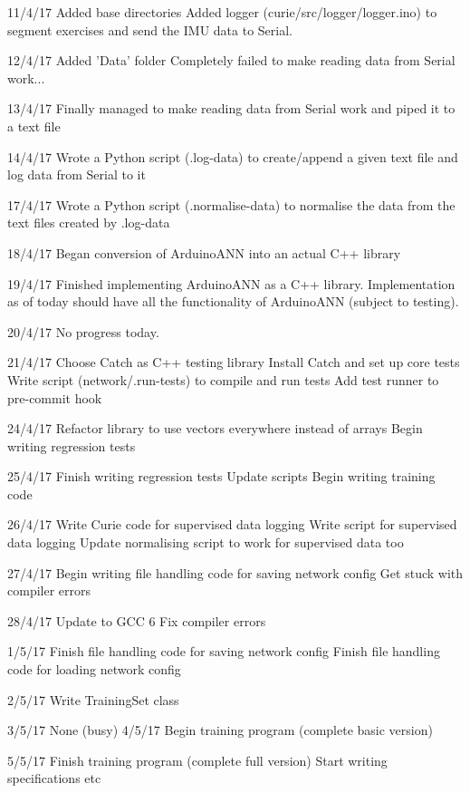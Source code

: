 \documentclass[a4paper]{article}
\begin{document}
11/4/17
    Added base directories
    Added logger (curie/src/logger/logger.ino) to segment exercises and send the IMU data to Serial.

12/4/17
    Added 'Data' folder
    Completely failed to make reading data from Serial work...

13/4/17
    Finally managed to make reading data from Serial work and piped it to a text file

14/4/17
    Wrote a Python script (.log-data) to create/append a given text file and log data from Serial to it

17/4/17
    Wrote a Python script (.normalise-data) to normalise the data from the text files created by .log-data

18/4/17
    Began conversion of ArduinoANN into an actual C++ library

19/4/17
    Finished implementing ArduinoANN as a C++ library. 
    Implementation as of today should have all the functionality of ArduinoANN (subject to testing).

20/4/17
    No progress today.

21/4/17
    Choose Catch as C++ testing library
    Install Catch and set up core tests
    Write script (network/.run-tests) to compile and run tests
    Add test runner to pre-commit hook

24/4/17
    Refactor library to use vectors everywhere instead of arrays
    Begin writing regression tests

25/4/17
    Finish writing regression tests
    Update scripts
    Begin writing training code

26/4/17
    Write Curie code for supervised data logging
    Write script for supervised data logging
    Update normalising script to work for supervised data too

27/4/17
    Begin writing file handling code for saving network config
    Get stuck with compiler errors

28/4/17
    Update to GCC 6
    Fix compiler errors

1/5/17
    Finish file handling code for saving network config
    Finish file handling code for loading network config

2/5/17
    Write TrainingSet class

3/5/17
    None (busy)
4/5/17
    Begin training program (complete basic version)

5/5/17
    Finish training program (complete full version)
    Start writing specifications etc
\end{document}
